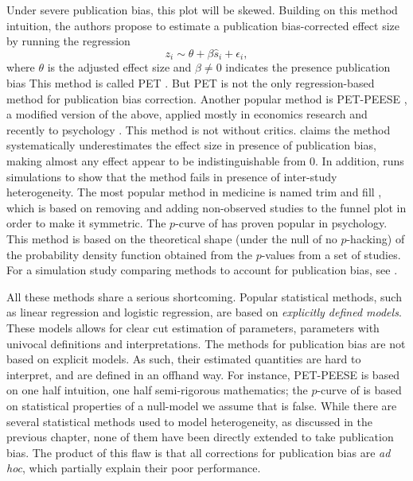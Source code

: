 Under severe publication bias, this plot will be skewed. Building
on this method intuition, the authors propose to estimate a publication
bias-corrected effect size by running the regression
\[
z_{i}\sim\theta+\beta\widehat{s}_{i}+\epsilon_{i},
\]
where $\theta$ is the adjusted effect size and $\beta\neq0$ indicates
the presence publication bias This method is called PET \parencite{stanley_beyond_2005}.
But PET is not the only regression-based method for publication bias
correction. Another popular method is PET-PEESE \parencite{Stanley2014-gx},
a modified version of the above, applied mostly in economics research
and recently to psychology \parencite{carter_series_2015}. This method
is not without critics. \cite{gervais_putting_2015} claims the method
systematically underestimates the effect size in presence of publication
bias, making almost any effect appear to be indistinguishable from
$0$. In addition, \cite{simonsohn_[59]_2017} runs simulations to
show that the method fails in presence of inter-study heterogeneity.
The most popular method in medicine is named trim and fill \parencite{Duval2000-ct},
which is based on removing and adding non-observed studies to the
funnel plot in order to make it symmetric. The $p$-curve of \cite{simonsohn_p-curve:_2014}
has proven popular in psychology. This method is based on the theoretical
shape (under the null of no $p$-hacking) of the probability density
function obtained from the $p$-values from a set of studies. For
a simulation study comparing methods to account for publication bias,
see \cite{moreno_assessment_2009}.

All these methods share a serious shortcoming. Popular statistical
methods, such as linear regression and logistic regression, are based
on\emph{ explicitly defined models}. These models allows for clear
cut estimation of parameters, parameters with univocal definitions
and interpretations. The methods for publication bias are not based
on explicit models. As such, their estimated quantities are hard to
interpret, and are defined in an offhand way. For instance, PET-PEESE
is based on one half intuition, one half semi-rigorous mathematics;
the $p$-curve of is based on statistical properties of a null-model
we assume that is false. While there are several statistical methods
used to model heterogeneity, as discussed in the previous chapter,
none of them have been directly extended to take publication bias.
The product of this flaw is that all corrections for publication bias
are \emph{ad hoc}, which partially explain their poor performance. 

